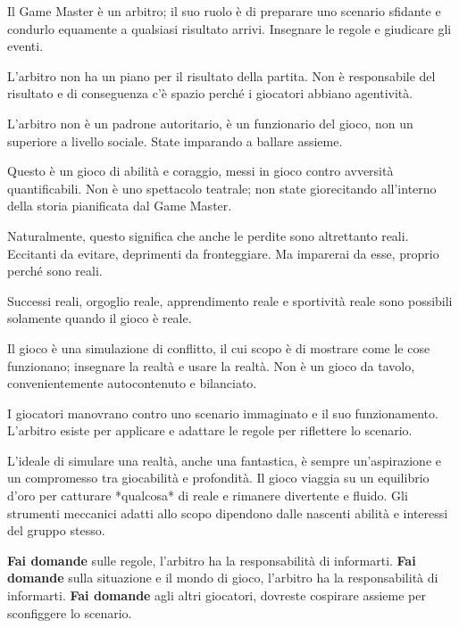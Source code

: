 

Il Game Master è un arbitro; il suo ruolo è di preparare uno scenario sfidante e condurlo equamente a qualsiasi risultato arrivi. Insegnare le regole e giudicare gli eventi.

L'arbitro non ha un piano per il risultato della partita. Non è responsabile del risultato e di conseguenza c'è spazio perché i giocatori abbiano agentività.

L'arbitro non è un padrone autoritario, è un funzionario del gioco, non un superiore a livello sociale. State imparando a ballare assieme.


Questo è un gioco di abilità e coraggio, messi in gioco contro avversità quantificabili. Non è uno spettacolo teatrale; non state giorecitando all'interno della storia pianificata dal Game Master.

Naturalmente, questo significa che anche le perdite sono altrettanto reali. Eccitanti da evitare, deprimenti da fronteggiare. Ma imparerai da esse, proprio perché sono reali.

Successi reali, orgoglio reale, apprendimento reale e sportività reale sono possibili solamente quando il gioco è reale.


Il gioco è una simulazione di conflitto, il cui scopo è di mostrare come le cose funzionano; insegnare la realtà e usare la realtà. Non è un gioco da tavolo, convenientemente autocontenuto e bilanciato.

I giocatori manovrano contro uno scenario immaginato e il suo funzionamento. L'arbitro esiste per applicare e adattare le regole per riflettere lo scenario.

L'ideale di simulare una realtà, anche una fantastica, è sempre un'aspirazione e un compromesso tra giocabilità e profondità. Il gioco viaggia su un equilibrio d'oro per catturare *qualcosa* di reale e rimanere divertente e fluido. Gli strumenti meccanici adatti allo scopo dipendono dalle nascenti abilità e interessi del gruppo stesso.


\textbf{Fai domande} sulle regole, l'arbitro ha la responsabilità di informarti. \textbf{Fai domande} sulla situazione e il mondo di gioco, l'arbitro ha la responsabilità di informarti. \textbf{Fai domande} agli altri giocatori, dovreste cospirare assieme per sconfiggere lo scenario.

